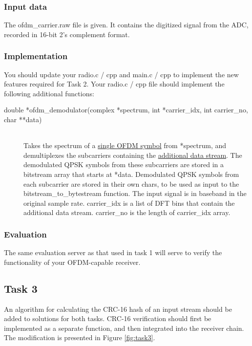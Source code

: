 \documentclass{article}
\begin{document}
\subsubsection{Input data}
The \textsf{ofdm\_carrier.raw} file is given. It contains the digitized signal from the ADC, recorded in 16-bit 2's complement format.

\subsubsection{Implementation}
You should update your \textsf{radio.c / cpp} and \textsf{main.c / cpp} to implement the new features required for Task 2. Your \textsf{radio.c / cpp} file should implement the following additional functions:
\begin{description}
	\item[double *ofdm\_demodulator(complex *spectrum, int *carrier\_idx, int carrier\_no, char **data)]
	\,\\ Takes the spectrum of a \underline{single OFDM symbol} from \textsf{*spectrum}, and demultiplexes the subcarriers containing the \underline{additional data stream}. The demodulated QPSK symbols from these subcarriers are stored in a bitstream array that starts at \textsf{*data}. Demodulated QPSK symbols from each subcarrier are stored in their own \textsf{char}s, to be used as input to the \textsf{bitstream\_to\_bytestream} function. The input signal is in baseband in the original sample rate. \textsf{carrier\_idx} is a list of DFT bins that contain the additional data stream. \textsf{carrier\_no} is the length of \textsf{carrier\_idx} array.
\end{description}

\subsubsection{Evaluation}

The same evaluation server as that used in task 1 will serve to verify the functionality of your OFDM-capable receiver.

\subsection{Task 3}
An algorithm for calculating the CRC-16 hash of an input stream should be added to solutions for both tasks. CRC-16 verification should first be implemented as a separate function, and then integrated into the receiver chain. The modification is presented in Figure \ref{fig:task3}.
\end{document}
